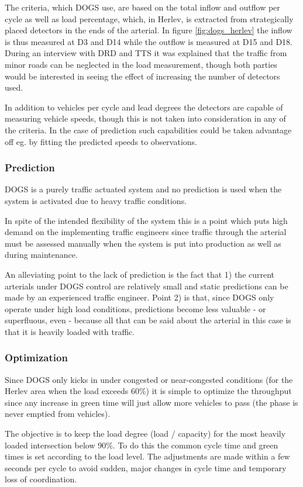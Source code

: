 The criteria, which DOGS use, are based on the total inflow and outflow per cycle as well as load percentage, which, in Herlev, is extracted from strategically placed detectors in the ends of the arterial. In figure \ref{fig:dogs_herlev} the inflow is thus measured at D3 and D14 while the outflow is measured at D15 and D18. 
During an interview with DRD and TTS it was explained that the traffic from minor roads can be neglected in the load measurement, though both parties would be interested in seeing the effect of increasing the number of detectors used.

In addition to vehicles per cycle and lead degrees the detectors are capable of measuring vehicle speeds, though this is not taken into consideration in any of the criteria. In the case of prediction such capabilities could be taken advantage off eg. by fitting the predicted speeds to observations.

\subsubsection*{Prediction}
DOGS is a purely traffic actuated system and no prediction is used when the system is activated due to heavy traffic conditions.

In spite of the intended flexibility of the system this is a point which puts high demand on the implementing traffic engineers since traffic through the arterial must be assessed manually when the system is put into production as well as during maintenance.

An alleviating point to the lack of prediction is the fact that 1) the current arterials under DOGS control are relatively small and static predictions can be made by an experienced traffic engineer. Point 2) is that, since DOGS only operate under high load conditions, predictions become less valuable - or superfluous, even - because all that can be said about the arterial in this case is that it is heavily loaded with traffic.

\subsubsection*{Optimization}
Since DOGS only kicks in under congested or near-congested conditions (for the Herlev area when the load exceeds 60\%) it is simple to optimize the throughput since any increase in green time will just allow more vehicles to pass (the phase is never emptied from vehicles).

The objective is to keep the load degree (load / capacity) for the most heavily loaded intersection below 90\%.
To do this the common cycle time and green times is set according to the load level. The adjustments are made within a few seconds per cycle to avoid sudden, major changes in cycle time and temporary loss of coordination.


